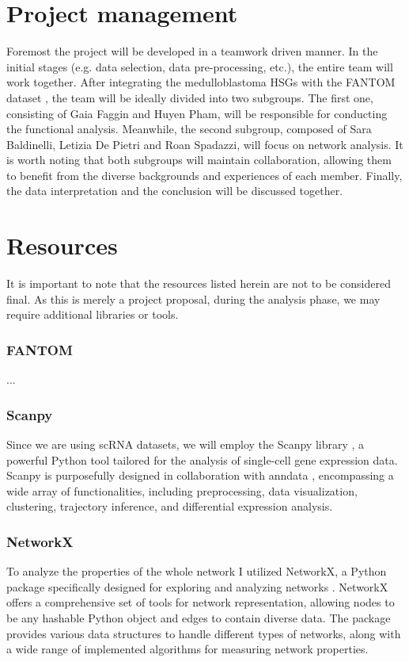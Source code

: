 \documentclass[10pt]{SelfArx} %
\begin{document}
\section{Project management}\label{sec:management}
Foremost the project will be developed in a teamwork driven manner. In the initial stages (e.g. data selection, data pre-processing, etc.), the entire team will work together. After integrating the medulloblastoma HSGs with the FANTOM dataset \cite{fantom5}, the team will be ideally divided into two subgroups. The first one, consisting of Gaia Faggin and Huyen Pham, will be responsible for conducting the functional analysis. Meanwhile, the second subgroup, composed of Sara Baldinelli, Letizia De Pietri and Roan Spadazzi, will focus on network analysis. It is worth noting that both subgroups will maintain collaboration, allowing them to benefit from the diverse backgrounds and experiences of each member. Finally, the data interpretation and the conclusion will be discussed together.

\section{Resources}\label{sec:resources}
It is important to note that the resources listed herein are not to be considered final. As this is merely a project proposal, during the analysis phase, we may require additional libraries or tools.

\subsubsection*{FANTOM}\label{fantom}
...

\subsubsection*{Scanpy}\label{scanpy}
Since we are using scRNA datasets, we will employ the Scanpy library \cite{wolf2018scanpy}, a powerful Python tool tailored for the analysis of single-cell gene expression data. Scanpy is purposefully designed in collaboration with anndata \cite{virshup2021anndata}, encompassing a wide array of functionalities, including preprocessing, data visualization, clustering, trajectory inference, and differential expression analysis. 

\subsubsection*{NetworkX}\label{networkX}
To analyze the properties of the whole network I utilized NetworkX, a Python package specifically designed for exploring and analyzing networks \cite{hagberg2008exploring}. NetworkX offers a comprehensive set of tools for network representation, allowing nodes to be any hashable Python object and edges to contain diverse data. The package provides various data structures to handle different types of networks, along with a wide range of implemented algorithms for measuring network properties. 





\end{document}
